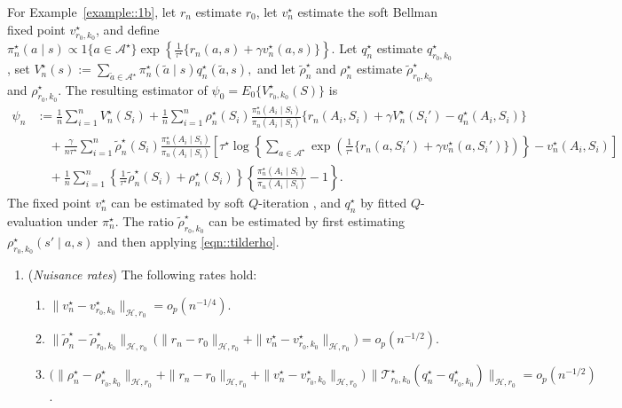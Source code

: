\documentclass[12pt]{article}
\theoremstyle{plain}
\begin{document}
For Example~\ref{example::1b}, let \(r_n\) estimate \(r_0\), let
\(v_n^\star\) estimate the soft Bellman fixed point
\(v_{r_0,k_0}^\star\), and define $\pi_n^\star(a\mid s)
\propto
1\{a\in\mathcal A^\star\}
\exp\!\left\{
\tfrac{1}{\tau^\star}\{r_n(a,s)+\gamma v_n^\star(a,s)\}
\right\}.$ Let \(q_n^\star\) estimate \(q_{r_0,k_0}^\star\), set $V_n^\star(s)
:=
\sum_{\tilde a\in\mathcal A^\star}
\pi_n^\star(\tilde a\mid s)q_n^\star(\tilde a,s),$
and let \(\widetilde\rho_n^\star\) and \(\rho_n^\star\) estimate
\(\widetilde\rho_{r_0,k_0}^\star\) and \(\rho_{r_0,k_0}^\star\). The resulting
estimator of \(\psi_0=E_0\{V_{r_0,k_0}^\star(S)\}\) is
\begin{align*}
\psi_n
&:=
\frac{1}{n}\sum_{i=1}^n V_n^\star(S_i)
+
\frac{1}{n}\sum_{i=1}^n
\rho_n^\star(S_i)
\frac{\pi_n^\star(A_i\mid S_i)}{\pi_n(A_i\mid S_i)}
\{r_n(A_i,S_i)+\gamma V_n^\star(S_i')-q_n^\star(A_i,S_i)\}
\\
&\quad+
\frac{\gamma}{n\tau^\star}\sum_{i=1}^n
\widetilde\rho_n^\star(S_i)
\frac{\pi_n^\star(A_i\mid S_i)}{\pi_n(A_i\mid S_i)}
\left[
\tau^\star
\log\!\left\{
\sum_{a\in\mathcal A^\star}
\exp\!\left(
\tfrac{1}{\tau^\star}\{r_n(a,S_i')+\gamma v_n^\star(a,S_i')\}
\right)
\right\}
-
v_n^\star(A_i,S_i)
\right]
\\
&\quad+
\frac{1}{n}\sum_{i=1}^n
\left\{
\tfrac{1}{\tau^\star}\widetilde\rho_n^\star(S_i)
+
\rho_n^\star(S_i)
\right\}
\left\{
\frac{\pi_n^\star(A_i\mid S_i)}{\pi_n(A_i\mid S_i)}-1
\right\}.
\end{align*}
The fixed point \(v_n^\star\) can be estimated by soft \(Q\)-iteration
\citep{haarnoja2017reinforcement,van2025stationary}, and \(q_n^\star\) by fitted
\(Q\)-evaluation under \(\pi_n^\star\). The ratio
\(\widetilde\rho_{r_0,k_0}^\star\) can be estimated by first estimating
\(\rho_{r_0,k_0}^\star(s'\mid a,s)\) and then applying
\eqref{eqn::tilderho}.  
\begin{enumerate}[label=\textbf{(E\arabic**)}, ref=E\arabic**, series=efficiency1b]
\item \label{assump:rates::softstar}(\textit{Nuisance rates})  
The following rates hold:
\begin{enumerate}[label=(\alph*)]
    \item \(\|v_n^\star - v_{r_0,k_0}^\star\|_{\mathcal{H},r_0}
    = o_p(n^{-1/4})\).
    
    \item \(\|\widetilde{\rho}_n^\star - \widetilde{\rho}_{r_0,k_0}^\star\|_{\mathcal{H},r_0}\,
    \bigl(\|r_n - r_0\|_{\mathcal{H},r_0} + \|v_n^\star - v_{r_0,k_0}^\star\|_{\mathcal{H},r_0}\bigr)
    = o_p(n^{-1/2})\).
    
    \item \(\bigl(\|\rho_n^\star - \rho_{r_0,k_0}^\star\|_{\mathcal{H},r_0}
      + \|r_n - r_0\|_{\mathcal{H},r_0}
      + \|v_n^\star - v_{r_0,k_0}^\star\|_{\mathcal{H},r_0}\bigr)\,
      \bigl\|\mathcal{T}_{r_0,k_0}^\star(q_n^\star - q_{r_0,k_0}^\star)\bigr\|_{\mathcal{H},r_0}
      = o_p(n^{-1/2})\).
\end{enumerate}
\end{enumerate}
\end{document}
